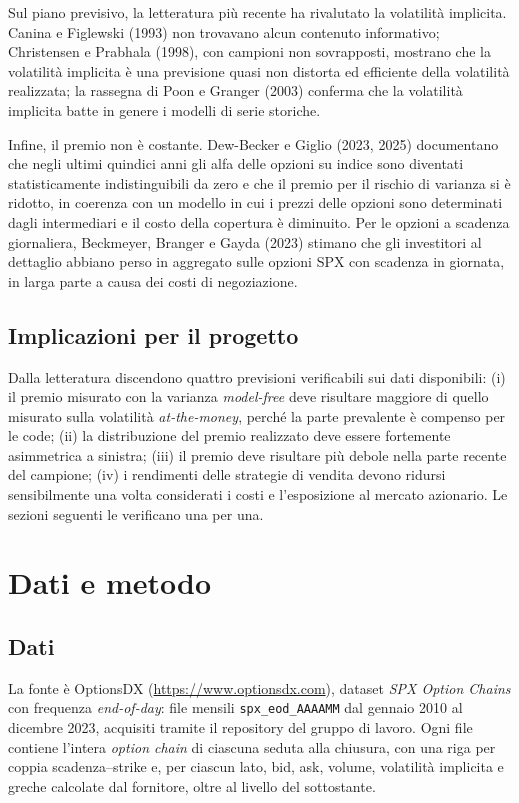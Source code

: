 \documentclass[11pt,a4paper]{article}
\begin{document}
Sul piano previsivo, la letteratura più recente ha rivalutato la volatilità implicita. Canina e Figlewski (1993) non trovavano alcun contenuto informativo; Christensen e Prabhala (1998), con campioni non sovrapposti, mostrano che la volatilità implicita è una previsione quasi non distorta ed efficiente della volatilità realizzata; la rassegna di Poon e Granger (2003) conferma che la volatilità implicita batte in genere i modelli di serie storiche.

Infine, il premio non è costante. Dew-Becker e Giglio (2023, 2025) documentano che negli ultimi quindici anni gli alfa delle opzioni su indice sono diventati statisticamente indistinguibili da zero e che il premio per il rischio di varianza si è ridotto, in coerenza con un modello in cui i prezzi delle opzioni sono determinati dagli intermediari e il costo della copertura è diminuito. Per le opzioni a scadenza giornaliera, Beckmeyer, Branger e Gayda (2023) stimano che gli investitori al dettaglio abbiano perso in aggregato sulle opzioni SPX con scadenza in giornata, in larga parte a causa dei costi di negoziazione.

\subsection{Implicazioni per il progetto}

Dalla letteratura discendono quattro previsioni verificabili sui dati disponibili: (i) il premio misurato con la varianza \emph{model-free} deve risultare maggiore di quello misurato sulla volatilità \emph{at-the-money}, perché la parte prevalente è compenso per le code; (ii) la distribuzione del premio realizzato deve essere fortemente asimmetrica a sinistra; (iii) il premio deve risultare più debole nella parte recente del campione; (iv) i rendimenti delle strategie di vendita devono ridursi sensibilmente una volta considerati i costi e l'esposizione al mercato azionario. Le sezioni seguenti le verificano una per una.

\section{Dati e metodo}\label{sec:dati}

\subsection{Dati}

La fonte è OptionsDX (\url{https://www.optionsdx.com}), dataset \emph{SPX Option Chains} con frequenza \emph{end-of-day}: file mensili \texttt{spx\_eod\_AAAAMM} dal gennaio 2010 al dicembre 2023, acquisiti tramite il repository del gruppo di lavoro. Ogni file contiene l'intera \emph{option chain} di ciascuna seduta alla chiusura, con una riga per coppia scadenza--strike e, per ciascun lato, bid, ask, volume, volatilità implicita e greche calcolate dal fornitore, oltre al livello del sottostante.
\end{document}
